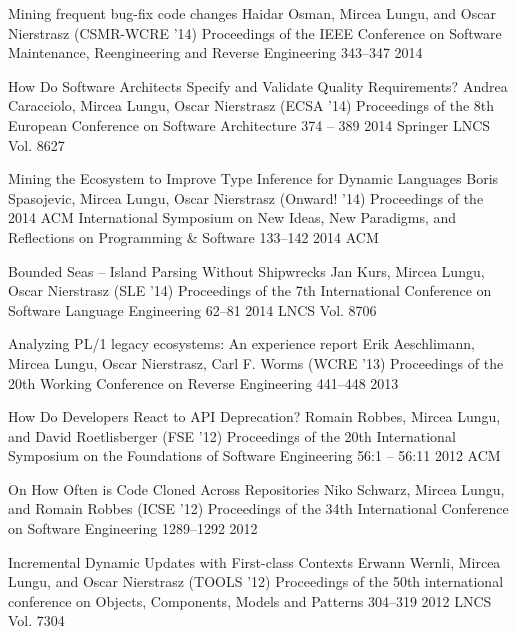 \begin{enumerate}


\densepap
	{Mining frequent bug-fix code changes}
	{Haidar Osman, Mircea Lungu, and Oscar Nierstrasz}
	{(CSMR-WCRE '14) Proceedings of the IEEE Conference on Software Maintenance, Reengineering and Reverse Engineering }
	{343--347}
	{2014}
	{\IEEE}



\densepap
	{How Do Software Architects Specify and Validate Quality Requirements?}
	{Andrea Caracciolo, Mircea Lungu, Oscar Nierstrasz}
	{(ECSA '14) Proceedings of the 8th European Conference on Software Architecture }
	{374 -- 389}
	{2014}
	{Springer LNCS Vol. 8627}

\densepap
	{Mining the Ecosystem to Improve Type Inference for Dynamic Languages}
	{Boris Spasojevic, Mircea Lungu, Oscar Nierstrasz}
	{(Onward! '14) Proceedings of the 2014 ACM International Symposium on New Ideas, New Paradigms, and Reflections on Programming \& Software }
	{133--142}
	{2014}
	{ACM}

\densepap
	{Bounded Seas -- Island Parsing Without Shipwrecks}
	{Jan Kurs, Mircea Lungu, Oscar Nierstrasz}
	{(SLE '14) Proceedings of the 7th International Conference on Software Language Engineering }
	{62--81}
	{2014}
	{LNCS Vol. 8706}

\densepap
	{Analyzing PL/1 legacy ecosystems: An experience report}
	{Erik Aeschlimann, Mircea Lungu, Oscar Nierstrasz, Carl F. Worms}
	{(WCRE '13) Proceedings of the 20th Working Conference on Reverse  Engineering }
	{441--448}
	{2013}
	{\IEEE}

\densepap
	{How Do Developers React to API Deprecation?}
	{Romain Robbes, Mircea Lungu, and David Roetlisberger}
	{(FSE '12) Proceedings of the 20th International Symposium on the Foundations of Software Engineering }
	{56:1 -- 56:11}
	{2012}
	{ACM}

\densepap
	{On How Often is Code Cloned Across Repositories}
	{Niko Schwarz, Mircea Lungu, and Romain Robbes}
	{(ICSE '12) Proceedings of the 34th International Conference on Software Engineering }
	{1289--1292}
	{2012}
	{\IEEE}

\densepap
	{Incremental Dynamic Updates with First-class Contexts}
	{Erwann Wernli, Mircea Lungu, and Oscar Nierstrasz}
	{(TOOLS '12) Proceedings of the 50th international conference on Objects, Components, Models and Patterns}
	{304--319}
	{2012}
	{LNCS Vol. 7304}




\end{enumerate}
